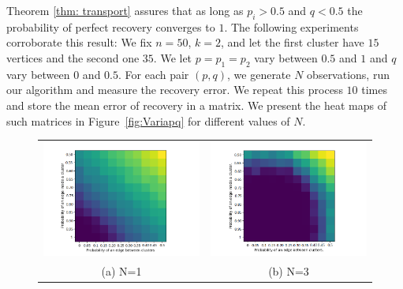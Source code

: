 \documentclass[12pt]{amsart}
\theoremstyle{remark}
\begin{document}
Theorem \ref{thm: transport} assures that as long as $p_i > 0.5$ and $q< 0.5$ the probability of perfect recovery converges to $1$. The following experiments corroborate this result:
We fix $n=50$, $k=2$, and let the first cluster have $15$ vertices and the second one $35$. We let $p =  p_1 = p_2$ vary between $0.5$ and $1$ and $q$ vary between $0$ and $0.5$.  For each pair $(p,q)$, we generate $N$ observations, run our algorithm and measure the recovery error. We repeat this process $10$ times and store the mean error of recovery in a matrix.
We present the heat maps of such matrices in Figure~\ref{fig:Variapq} for different values of $N$. 


\begin{figure}[H]
\begin{tabular}{cc}
  \includegraphics[width=85mm]{./Pictures/Variapq1.PNG} &   \includegraphics[width=85mm]{./Pictures/Variapq3.PNG} \\
(a) N=1 & (b) N=3 \\[6pt]

\end{tabular}
\end{figure}
\end{document}
